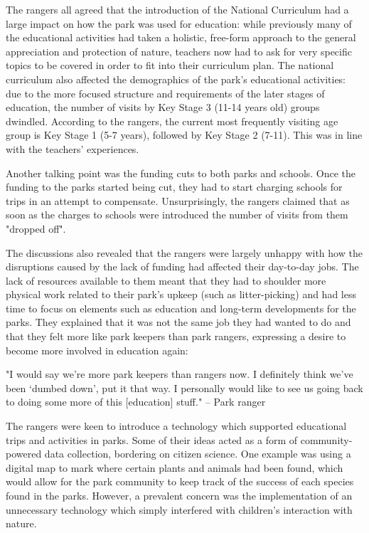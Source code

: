 The rangers all agreed that the introduction of the National Curriculum had a large impact on how the park was used for education: while previously many of the educational activities had taken a holistic, free-form approach to the general appreciation and protection of nature, teachers now had to ask for very specific topics to be covered in order to fit into their curriculum plan. The national curriculum also affected the demographics of the park’s educational activities: due to the more focused structure and requirements of the later stages of education, the number of visits by Key Stage 3 (11-14 years old) groups dwindled. According to the rangers, the current most frequently visiting age group is Key Stage 1 (5-7 years), followed by Key Stage 2 (7-11). This was in line with the teachers’ experiences.

Another talking point was the funding cuts to both parks and schools. Once the funding to the parks started being cut, they had to start charging schools for trips in an attempt to compensate. Unsurprisingly, the rangers claimed that as soon as the charges to schools were introduced the number of visits from them "dropped off".

The discussions also revealed that the rangers were largely unhappy with how the disruptions caused by the lack of funding had affected their day-to-day jobs. The lack of resources available to them meant that they had to shoulder more physical work related to their park’s upkeep (such as litter-picking) and had less time to focus on elements such as education and long-term developments for the parks. They explained that it was not the same job they had wanted to do and that they felt more like park keepers than park rangers, expressing a desire to become more involved in education again:

\begin{displayquote}
"I would say we're more park keepers than rangers now. I definitely think we've been `dumbed down', put it that way. I personally would like to see us going back to doing some more of this [education] stuff." – Park ranger
\end{displayquote}

The rangers were keen to introduce a technology which supported educational trips and activities in parks. Some of their ideas acted as a form of community-powered data collection, bordering on citizen science. One example was using a digital map to mark where certain plants and animals had been found, which would allow for the park community to keep track of the success of each species found in the parks. However, a prevalent concern was the implementation of an unnecessary technology which simply interfered with children’s interaction with nature.

